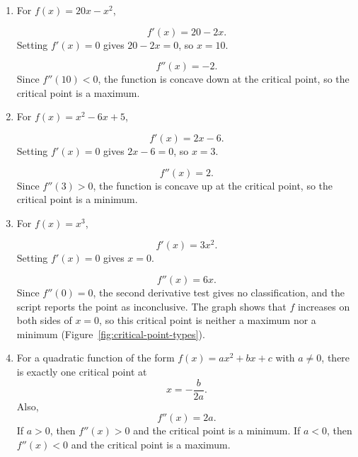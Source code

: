 \begin{Answer}[ref=optimization3]

\begin{enumerate}
\item For $f(x) = 20x - x^2$,

\[
f'(x) = 20 - 2x.
\]
Setting $f'(x)=0$ gives $20 - 2x = 0$, so $x = 10$.

\[
f''(x) = -2.
\]
Since $f''(10) < 0$, the function is concave down at the critical point,
so the critical point is a maximum.

\item For $f(x) = x^2 - 6x + 5$,

\[
f'(x) = 2x - 6.
\]
Setting $f'(x)=0$ gives $2x - 6 = 0$, so $x = 3$.

\[
f''(x) = 2.
\]
Since $f''(3) > 0$, the function is concave up at the critical point,
so the critical point is a minimum.

\item For $f(x) = x^3$,

\[
f'(x) = 3x^2.
\]
Setting $f'(x)=0$ gives $x = 0$.

\[
f''(x) = 6x.
\]
Since $f''(0) = 0$, the second derivative test gives no classification,
and the script reports the point as inconclusive. The graph shows that
$f$ increases on both sides of $x = 0$, so this critical point is
neither a maximum nor a minimum (Figure~\ref{fig:critical-point-types}).

\item For a quadratic function of the form $f(x) = ax^2 + bx + c$ with
$a \neq 0$, there is exactly one critical point at
\[
x = -\frac{b}{2a}.
\]
Also,
\[
f''(x) = 2a.
\]
If $a>0$, then $f''(x)>0$ and the critical point is a minimum.
If $a<0$, then $f''(x)<0$ and the critical point is a maximum.
\end{enumerate}

\end{Answer}
